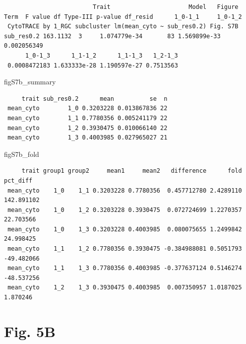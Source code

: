 \documentclass[
  landscape]{article}
\newenvironment{Shaded}{\begin{snugshade}}{\end{snugshade}}
\newcommand{\NormalTok}[1]{#1}
\begin{document}
\begin{verbatim}
                         Trait                      Model   Figure       Term  F value df Type-III p-value df_resid      1_0-1_1     1_0-1_2
 CytoTRACE by 1_RGC subcluster lm(mean_cyto ~ sub_res0.2) Fig. S7B sub_res0.2 163.1132  3     1.074779e-34       83 1.569899e-33 0.002056349
      1_0-1_3      1_1-1_2      1_1-1_3   1_2-1_3
 0.0008472183 1.633333e-28 1.190597e-27 0.7513563
\end{verbatim}

\begin{Shaded}
\begin{Highlighting}[]
\NormalTok{figS7b\_summary}
\end{Highlighting}
\end{Shaded}

\begin{verbatim}
     trait sub_res0.2      mean          se  n
 mean_cyto        1_0 0.3203228 0.013867836 22
 mean_cyto        1_1 0.7780356 0.005241179 22
 mean_cyto        1_2 0.3930475 0.010066140 22
 mean_cyto        1_3 0.4003985 0.027965027 21
\end{verbatim}

\begin{Shaded}
\begin{Highlighting}[]
\NormalTok{figS7b\_fold}
\end{Highlighting}
\end{Shaded}

\begin{verbatim}
     trait group1 group2     mean1     mean2   difference      fold   pct_diff
 mean_cyto    1_0    1_1 0.3203228 0.7780356  0.457712780 2.4289110 142.891102
 mean_cyto    1_0    1_2 0.3203228 0.3930475  0.072724699 1.2270357  22.703566
 mean_cyto    1_0    1_3 0.3203228 0.4003985  0.080075655 1.2499842  24.998425
 mean_cyto    1_1    1_2 0.7780356 0.3930475 -0.384988081 0.5051793 -49.482066
 mean_cyto    1_1    1_3 0.7780356 0.4003985 -0.377637124 0.5146274 -48.537256
 mean_cyto    1_2    1_3 0.3930475 0.4003985  0.007350957 1.0187025   1.870246
\end{verbatim}

\section{Fig. 5B}\label{fig.-5b}
\end{document}
